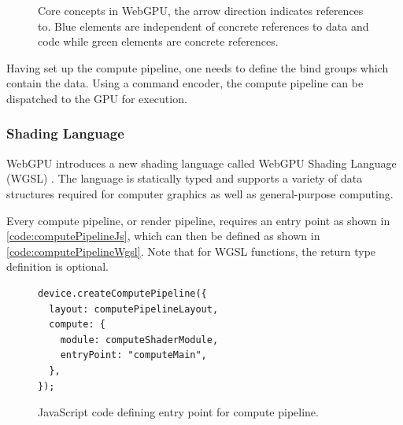 \begin{figure}[H]
  \centering
  \caption{Core concepts in WebGPU, the arrow direction indicates references to. Blue elements are independent of concrete references to data and code while green elements are concrete references.}
  \label{fig:webgpu-arch}
\end{figure}

Having set up the compute pipeline, one needs to define the bind groups which contain the data. Using a command encoder, the compute pipeline can be dispatched to the \gls{GPU} for execution.

\subsubsection{Shading Language}

\gls{WebGPU} introduces a new shading language called \gls{WebGPU} Shading Language (\gls{WGSL}) \cite{wgslSpecification}. The language is statically typed and supports a variety of data structures required for computer graphics as well as general-purpose computing.

Every compute pipeline, or render pipeline, requires an entry point as shown in \autoref{code:computePipelineJs}, which can then be defined as shown in \autoref{code:computePipelineWgsl}. Note that for \gls{WGSL} functions, the return type definition is optional.

\begin{figure}[H]
  \begin{lstlisting}[style=JavaScript]
device.createComputePipeline({
  layout: computePipelineLayout,
  compute: {
    module: computeShaderModule,
    entryPoint: "computeMain",
  },
});
  \end{lstlisting}
  \caption{JavaScript code defining entry point for compute pipeline.}
  \label{code:computePipelineJs}
\end{figure}

